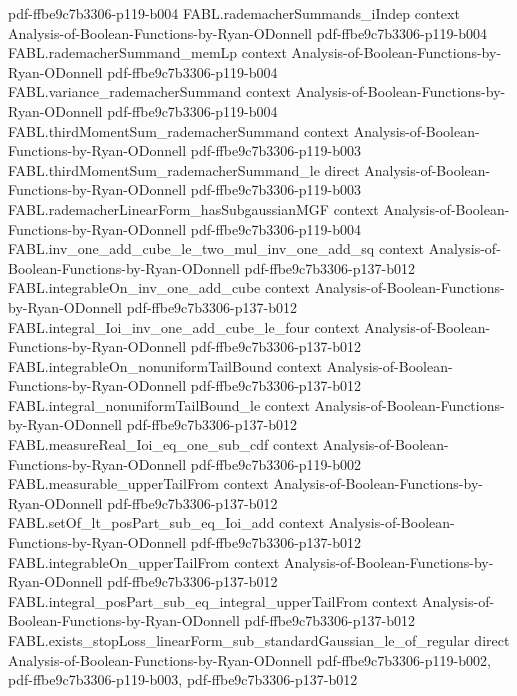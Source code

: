 \begin{theorem}
  {pdf-ffbe9c7b3306-p119-b004}
\proofstep
  {FABL.rademacherSummands_iIndep}
  {context}
  {Analysis-of-Boolean-Functions-by-Ryan-ODonnell}
  {pdf-ffbe9c7b3306-p119-b004}
\proofstep
  {FABL.rademacherSummand_memLp}
  {context}
  {Analysis-of-Boolean-Functions-by-Ryan-ODonnell}
  {pdf-ffbe9c7b3306-p119-b004}
\proofstep
  {FABL.variance_rademacherSummand}
  {context}
  {Analysis-of-Boolean-Functions-by-Ryan-ODonnell}
  {pdf-ffbe9c7b3306-p119-b004}
\proofstep
  {FABL.thirdMomentSum_rademacherSummand}
  {context}
  {Analysis-of-Boolean-Functions-by-Ryan-ODonnell}
  {pdf-ffbe9c7b3306-p119-b003}
\proofstep
  {FABL.thirdMomentSum_rademacherSummand_le}
  {direct}
  {Analysis-of-Boolean-Functions-by-Ryan-ODonnell}
  {pdf-ffbe9c7b3306-p119-b003}
\proofstep
  {FABL.rademacherLinearForm_hasSubgaussianMGF}
  {context}
  {Analysis-of-Boolean-Functions-by-Ryan-ODonnell}
  {pdf-ffbe9c7b3306-p119-b004}
\proofstep
  {FABL.inv_one_add_cube_le_two_mul_inv_one_add_sq}
  {context}
  {Analysis-of-Boolean-Functions-by-Ryan-ODonnell}
  {pdf-ffbe9c7b3306-p137-b012}
\proofstep
  {FABL.integrableOn_inv_one_add_cube}
  {context}
  {Analysis-of-Boolean-Functions-by-Ryan-ODonnell}
  {pdf-ffbe9c7b3306-p137-b012}
\proofstep
  {FABL.integral_Ioi_inv_one_add_cube_le_four}
  {context}
  {Analysis-of-Boolean-Functions-by-Ryan-ODonnell}
  {pdf-ffbe9c7b3306-p137-b012}
\proofstep
  {FABL.integrableOn_nonuniformTailBound}
  {context}
  {Analysis-of-Boolean-Functions-by-Ryan-ODonnell}
  {pdf-ffbe9c7b3306-p137-b012}
\proofstep
  {FABL.integral_nonuniformTailBound_le}
  {context}
  {Analysis-of-Boolean-Functions-by-Ryan-ODonnell}
  {pdf-ffbe9c7b3306-p137-b012}
\proofstep
  {FABL.measureReal_Ioi_eq_one_sub_cdf}
  {context}
  {Analysis-of-Boolean-Functions-by-Ryan-ODonnell}
  {pdf-ffbe9c7b3306-p119-b002}
\proofstep
  {FABL.measurable_upperTailFrom}
  {context}
  {Analysis-of-Boolean-Functions-by-Ryan-ODonnell}
  {pdf-ffbe9c7b3306-p137-b012}
\proofstep
  {FABL.setOf_lt_posPart_sub_eq_Ioi_add}
  {context}
  {Analysis-of-Boolean-Functions-by-Ryan-ODonnell}
  {pdf-ffbe9c7b3306-p137-b012}
\proofstep
  {FABL.integrableOn_upperTailFrom}
  {context}
  {Analysis-of-Boolean-Functions-by-Ryan-ODonnell}
  {pdf-ffbe9c7b3306-p137-b012}
\proofstep
  {FABL.integral_posPart_sub_eq_integral_upperTailFrom}
  {context}
  {Analysis-of-Boolean-Functions-by-Ryan-ODonnell}
  {pdf-ffbe9c7b3306-p137-b012}
\proofstep
  {FABL.exists_stopLoss_linearForm_sub_standardGaussian_le_of_regular}
  {direct}
  {Analysis-of-Boolean-Functions-by-Ryan-ODonnell}
  {pdf-ffbe9c7b3306-p119-b002,
    pdf-ffbe9c7b3306-p119-b003,
    pdf-ffbe9c7b3306-p137-b012}

\end{theorem}
